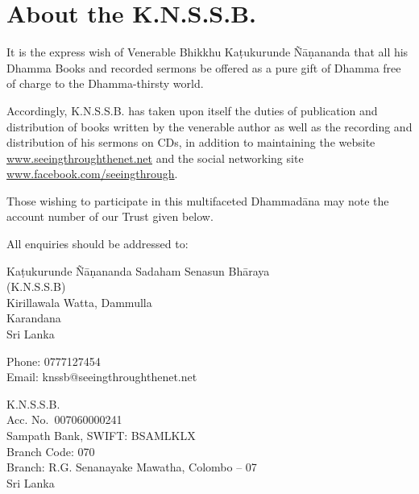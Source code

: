 \chapter{About the K.N.S.S.B.}

It is the express wish of Venerable Bhikkhu Kaṭukurunde Ñāṇananda that all his Dhamma Books and recorded sermons be offered as a pure gift of Dhamma free of charge to the Dhamma-thirsty world.

Accordingly, K.N.S.S.B. has taken upon itself the duties of publication and distribution of books written by the venerable author as well as the recording and distribution of his sermons on CDs, in addition to maintaining the website \href{https://seeingthroughthenet.net/}{www.seeingthroughthenet.net} and the social networking site \href{https://www.facebook.com/seeingthrough}{www.facebook.com/seeingthrough}.

Those wishing to participate in this multifaceted Dhammadāna may note the account number of our Trust given below.

All enquiries should be addressed to:

Kaṭukurunde Ñāṇananda Sadaham Senasun Bhāraya\\
(K.N.S.S.B)\\
Kirillawala Watta, Dammulla\\
Karandana\\
Sri Lanka

Phone: 0777127454\\
Email: knssb@seeingthroughthenet.net

K.N.S.S.B.\\
Acc. No.~007060000241\\
Sampath Bank, SWIFT: BSAMLKLX\\
Branch Code: 070\\
Branch: R.G. Senanayake Mawatha, Colombo -- 07\\
Sri Lanka

